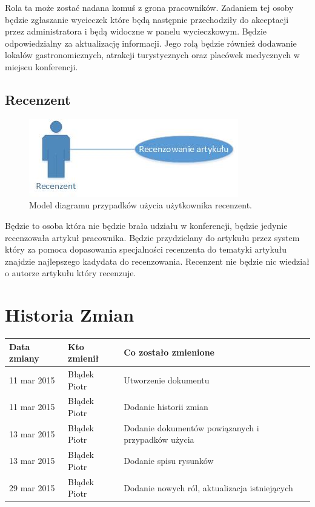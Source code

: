 Rola ta może zostać nadana komuś z grona pracowników. Zadaniem tej osoby będzie zgłaszanie wycieczek które będą następnie przechodziły do akceptacji przez administratora i będą widoczne w panelu wycieczkowym. Będzie odpowiedzialny za aktualizację informacji. Jego rolą będzie również dodawanie lokalów gastronomicznych, atrakcji turystycznych oraz placówek medycznych w miejscu konferencji.

\subsection{Recenzent}

\begin{figure}[!tb]
    \centering
    \includegraphics{recenzent.jpg}
    \caption{Model diagramu przypadków użycia użytkownika recenzent.}
    \label{fig:recenzent}
\end{figure}

Będzie to osoba która nie będzie brała udziału w konferencji, będzie jedynie recenzowała artykuł pracownika. Będzie przydzielany do artykułu przez system który za pomoca dopasowania specjalności recenzenta do tematyki artykułu znajdzie najlepszego kadydata do recenzowania. Recenzent nie będzie nic wiedział o autorze artykułu który recenzuje.

\section{Historia Zmian}

\begin{tabularx}{\textwidth}{X|l|X}
\hline
\textbf{Data zmiany} & \textbf{Kto zmienił} & \textbf{Co zostało zmienione} \\ \hline
11 mar 2015          & Błądek Piotr         & Utworzenie dokumentu          \\ \hline
11 mar 2015          &Błądek Piotr          &  Dodanie historii zmian            \\ \hline
13 mar 2015          &Błądek Piotr          &  Dodanie dokumentów powiązanych i przypadków użycia            \\ \hline
13 mar 2015          &Błądek Piotr          &  Dodanie spisu rysunków            \\ \hline
29 mar 2015          &Błądek Piotr          &  Dodanie nowych ról, aktualizacja istniejących            \\ \hline
\end{tabularx}